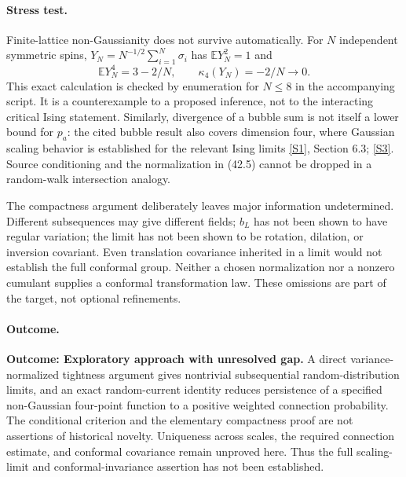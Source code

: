 \documentclass[11pt,a4paper]{article}
\newcommand{\E}{\mathbb{E}}
\newcommand{\sref}[2]{\hyperlink{source:#1:#2}{[S#2]}}
\numberwithin{equation}{section}
\begin{document}
\paragraph{Stress test.}
Finite-lattice non-Gaussianity does not survive automatically. For $N$
independent symmetric spins, $Y_N=N^{-1/2}\sum_{i=1}^N\sigma_i$ has
$\E Y_N^2=1$ and
\[
 \E Y_N^4=3-2/N,\qquad \kappa_4(Y_N)=-2/N\longrightarrow0.
\]
This exact calculation is checked by enumeration for $N\le8$ in the
accompanying script. It is a counterexample to a proposed inference, not
to the interacting critical Ising statement. Similarly, divergence of a
bubble sum is not itself a lower bound for $p_a$: the cited bubble result
also covers dimension four, where Gaussian scaling behavior is established
for the relevant Ising limits \sref{42}{1}, Section 6.3; \sref{42}{3}.
Source conditioning and the normalization in (42.5) cannot be dropped in a
random-walk intersection analogy.

The compactness argument deliberately leaves major information undetermined.
Different subsequences may give different fields; $b_L$ has not been shown
to have regular variation; the limit has not been shown to be rotation,
dilation, or inversion covariant. Even translation covariance inherited in
a limit would not establish the full conformal group. Neither a chosen
normalization nor a nonzero cumulant supplies a conformal transformation
law. These omissions are part of the target, not optional refinements.

\paragraph{Outcome.}
\textbf{Outcome: Exploratory approach with unresolved gap.}
A direct variance-normalized tightness argument gives nontrivial
subsequential random-distribution limits, and an exact random-current
identity reduces persistence of a specified non-Gaussian four-point
function to a positive weighted connection probability. The conditional
criterion and the elementary compactness proof are not assertions of
historical novelty. Uniqueness across scales, the required connection
estimate, and conformal covariance remain unproved here. Thus the full
scaling-limit and conformal-invariance assertion has not been established.
\end{document}
